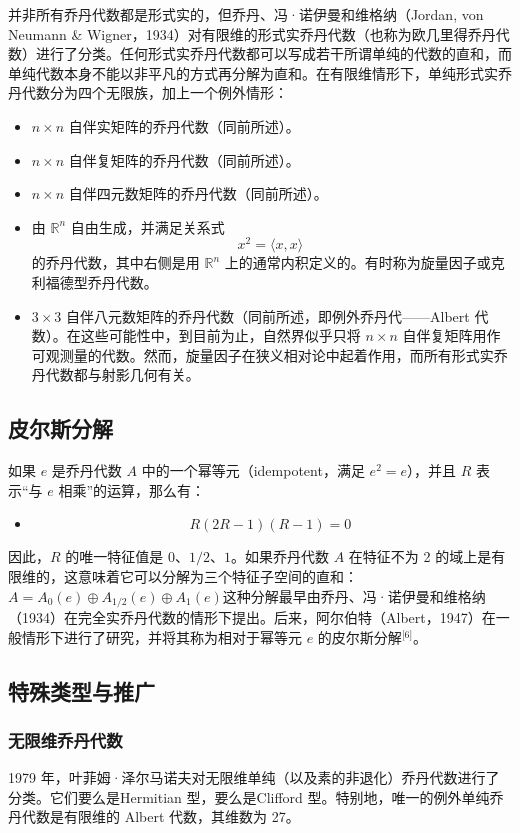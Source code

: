 并非所有乔丹代数都是形式实的，但乔丹、冯·诺伊曼和维格纳（Jordan, von Neumann & Wigner，1934）对有限维的形式实乔丹代数（也称为欧几里得乔丹代数）进行了分类。任何形式实乔丹代数都可以写成若干所谓单纯的代数的直和，而单纯代数本身不能以非平凡的方式再分解为直和。在有限维情形下，单纯形式实乔丹代数分为四个无限族，加上一个例外情形：
\begin{itemize}
\item $n \times n$ 自伴实矩阵的乔丹代数（同前所述）。
\item $n \times n$ 自伴复矩阵的乔丹代数（同前所述）。
\item $n \times n$ 自伴四元数矩阵的乔丹代数（同前所述）。
\item 由 $\mathbb{R}^n$ 自由生成，并满足关系式
$$
x^2 = \langle x, x \rangle~
$$
的乔丹代数，其中右侧是用 $\mathbb{R}^n$ 上的通常内积定义的。有时称为旋量因子或克利福德型乔丹代数。
\item $3 \times 3$ 自伴八元数矩阵的乔丹代数（同前所述，即例外乔丹代——Albert 代数）。在这些可能性中，到目前为止，自然界似乎只将 $n \times n$ 自伴复矩阵用作可观测量的代数。然而，旋量因子在狭义相对论中起着作用，而所有形式实乔丹代数都与射影几何有关。
\end{itemize}
\subsection{皮尔斯分解}
如果 $e$ 是乔丹代数 $A$ 中的一个幂等元（idempotent，满足 $e^2 = e$），并且 $R$ 表示“与 $e$ 相乘”的运算，那么有：
\begin{itemize}
\item
$$
R(2R - 1)(R - 1) = 0~
$$
\end{itemize}
因此，$R$ 的唯一特征值是 $0$、$1/2$、$1$。如果乔丹代数 $A$ 在特征不为 2 的域上是有限维的，这意味着它可以分解为三个特征子空间的直和：$A = A_0(e) \oplus A_{1/2}(e) \oplus A_1(e)$这种分解最早由乔丹、冯·诺伊曼和维格纳（1934）在完全实乔丹代数的情形下提出。后来，阿尔伯特（Albert，1947）在一般情形下进行了研究，并将其称为相对于幂等元 $e$ 的皮尔斯分解\(^\text{[6]}\)。
\subsection{特殊类型与推广}
\subsubsection{无限维乔丹代数}
1979 年，叶菲姆·泽尔马诺夫对无限维单纯（以及素的非退化）乔丹代数进行了分类。它们要么是Hermitian 型，要么是Clifford 型。特别地，唯一的例外单纯乔丹代数是有限维的 Albert 代数，其维数为 27。
